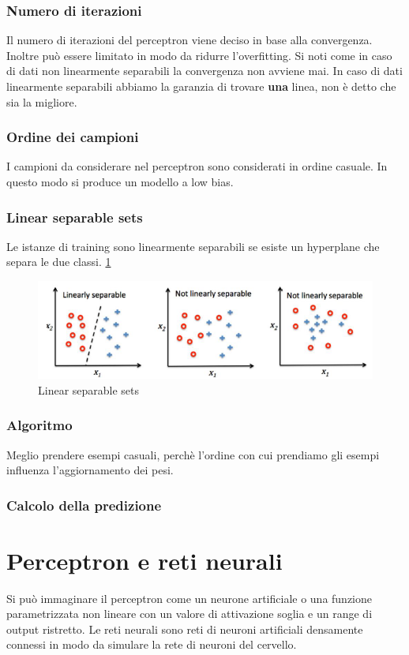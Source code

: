 		\subsubsection{Numero di iterazioni}
		Il numero di iterazioni del perceptron viene deciso in base alla convergenza.
		Inoltre pu\`o essere limitato in modo da ridurre l'overfitting.
		Si noti come in caso di dati non linearmente separabili la convergenza non avviene mai. 
		In caso di dati linearmente separabili abbiamo la garanzia di trovare \textbf{una} linea, non è detto che sia la migliore.
		
		\subsubsection{Ordine dei campioni}
		I campioni da considerare nel perceptron sono considerati in ordine casuale.
		In questo modo si produce un modello a low bias.
		
		\subsubsection{Linear separable sets}
		Le istanze di training sono linearmente separabili se esiste un hyperplane che separa le due classi. \ref{fig:chapter04-01}
		\begin{figure}
			\centering
			\includegraphics[width=0.6\linewidth]{imgs/chapter4/img1}
			\caption{Linear separable sets}
			\label{fig:chapter04-01}
		\end{figure}
		
		\subsubsection{Algoritmo}
		
		
		Meglio prendere esempi casuali, perch\`e l'ordine con cui prendiamo gli esempi influenza l'aggiornamento dei pesi.
		
		\subsubsection{Calcolo della predizione}
		

\section{Perceptron e reti neurali}
Si pu\`o immaginare il perceptron come un neurone artificiale o una funzione parametrizzata non lineare con un valore di attivazione soglia e un range di output ristretto.
Le reti neurali sono reti di neuroni artificiali densamente connessi in modo da simulare la rete di neuroni del cervello.

